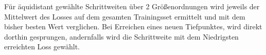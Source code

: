 Für äquidistant gewählte Schrittweiten über 2 Größenordnungen wird jeweils der Mittelwert des Losses auf dem gesamten Trainingsset ermittelt und mit dem bisher besten Wert verglichen. Bei Erreichen eines neuen Tiefpunktes, wird direkt dorthin gesprungen, andernfalls wird die Schrittweite mit dem Niedrigsten erreichten Loss gewählt.







